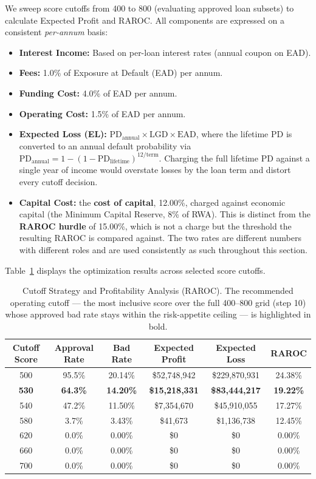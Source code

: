 \documentclass[11pt,a4paper]{article}
\begin{document}
We sweep score cutoffs from 400 to 800 (evaluating approved loan subsets) to calculate Expected Profit and RAROC. All components are expressed on a consistent \emph{per-annum} basis:
\begin{itemize}
    \item \textbf{Interest Income:} Based on per-loan interest rates (annual coupon on EAD).
    \item \textbf{Fees:} 1.0\% of Exposure at Default (EAD) per annum.
    \item \textbf{Funding Cost:} 4.0\% of EAD per annum.
    \item \textbf{Operating Cost:} 1.5\% of EAD per annum.
    \item \textbf{Expected Loss (EL):} $\text{PD}_{\text{annual}} \times \text{LGD} \times \text{EAD}$, where the lifetime PD is converted to an annual default probability via $\text{PD}_{\text{annual}} = 1 - (1 - \text{PD}_{\text{lifetime}})^{12/\text{term}}$. Charging the full lifetime PD against a single year of income would overstate losses by the loan term and distort every cutoff decision.
    \item \textbf{Capital Cost:} the \textbf{cost of capital}, 12.00\%, charged against economic capital (the Minimum Capital Reserve, 8\% of RWA). This is distinct from the \textbf{RAROC hurdle} of 15.00\%, which is not a charge but the threshold the resulting RAROC is compared against. The two rates are different numbers with different roles and are used consistently as such throughout this section.
\end{itemize}

Table~\ref{tab:cutoff_raroc} displays the optimization results across selected score cutoffs.

\begin{table}[H]
\centering
\caption{Cutoff Strategy and Profitability Analysis (RAROC). The recommended operating cutoff --- the most inclusive score over the full 400--800 grid (step 10) whose approved bad rate stays within the risk-appetite ceiling --- is highlighted in bold.}
\label{tab:cutoff_raroc}
\vspace{0.5em}
\begin{tabular}{cccccc}
\toprule
\textbf{Cutoff Score} & \textbf{Approval Rate} & \textbf{Bad Rate} & \textbf{Expected Profit} & \textbf{Expected Loss} & \textbf{RAROC} \\
\midrule
500 & 95.5\% & 20.14\% & \$52,748,942 & \$229,870,931 & 24.38\% \\
\textbf{530} & \textbf{64.3\%} & \textbf{14.20\%} & \textbf{\$15,218,331} & \textbf{\$83,444,217} & \textbf{19.22\%} \\
540 & 47.2\% & 11.50\% & \$7,354,670 & \$45,910,055 & 17.27\% \\
580 & 3.7\% & 3.43\% & \$41,673 & \$1,136,738 & 12.45\% \\
620 & 0.0\% & 0.00\% & \$0 & \$0 & 0.00\% \\
660 & 0.0\% & 0.00\% & \$0 & \$0 & 0.00\% \\
700 & 0.0\% & 0.00\% & \$0 & \$0 & 0.00\% \\
\bottomrule
\end{tabular}
\end{table}
\end{document}
